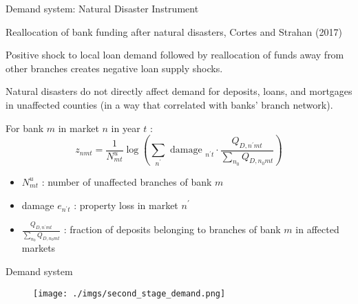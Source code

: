 \documentclass[notes,11pt, aspectratio=169]{beamer}
\newenvironment{wideitemize}{\itemize\addtolength{\itemsep}{10pt}}{\enditemize}
\begin{document}
\begin{frame}{Demand system: Natural Disaster Instrument}
    \vspace{0.2cm}
    
    \begin{wideitemize}
\item  Reallocation of bank funding after natural disasters, Cortes and Strahan (2017)
\item Positive shock to local loan demand followed by reallocation of funds away from other branches creates negative loan supply shocks. %

\item Natural disasters do not directly affect demand for deposits, loans, and mortgages in unaffected counties (in a way that correlated with banks' branch network).
\pause
\item For bank $m$ in market $n$ in year $t$ :
$$
z_{n m t}=\frac{1}{N_{m t}^u} \log \left(\sum_{n^{\prime}} \text { damage }_{n^{\prime} t} \cdot \frac{Q_{D, n^{\prime} m t}}{\sum_{n_0} Q_{D, n_0 m t}}\right)
$$

\begin{itemize}
\item $N_{m t}^u$ : number of unaffected branches of bank $m$
\item damage $e_{n^{\prime} t}$ : property loss in market $n^{\prime}$
\item $\frac{Q_{D, n^{\prime} m t}}{\sum_{n_0} Q_{D, n_0 m t}}$ : fraction of deposits belonging to branches of bank $m$ in affected markets
\end{itemize}
\end{wideitemize}
\end{frame}


\begin{frame}{Demand system}\label{demand}
    \vspace{0.5cm}
      
        \begin{figure}[t*]
          \centering
    
          \texttt{[image: ./imgs/second\_stage\_demand.png]}
       
        \end{figure}

        \hyperlink{firststage}{}
        
      \end{frame}
\end{document}
